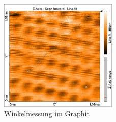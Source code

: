 \begin{figure}[H]
	\centering
	\includegraphics[width=0.5\textwidth]{Mess/graphit_winkel.png}
	\caption{Winkelmessung im Graphit}
	\label{graphwinkel}
\end{figure}

